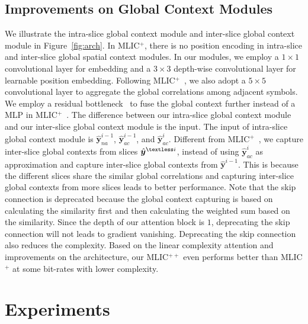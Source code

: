 \documentclass{article}
\theoremstyle{plain}
\theoremstyle{definition}
\theoremstyle{remark}
\begin{document}
  \subsection{Improvements on Global Context Modules}
  We illustrate the intra-slice global context module and 
  inter-slice global context module in Figure~\ref{fig:arch}.
  In MLIC$^+$, there is no position encoding in intra-slice and inter-slice global spatial
  context modules.
  In our modules, we employ a $1\times 1$ convolutional layer for embedding and a $3\times 3$
  depth-wise convolutional layer for learnable position embedding.
  Following MLIC$^+$~\cite{jiang2022mlic}, we also adopt a $5\times 5$
  convolutional layer to aggregate the global correlations among adjacent symbols.
  We employ a residual bottleneck~\cite{jiang2023slic} to fuse the global context further instead of a MLP in MLIC$^{+}$~\cite{jiang2022mlic}.
  The difference between our intra-slice global context module and
  our inter-slice global context module is the input.
  The input of intra-slice global context module is $\hat{\boldsymbol{y}}^{i-1}_{na}$,
  $\hat{\boldsymbol{y}}^{i-1}_{ac}$, and $\hat{\boldsymbol{y}}^i_{ac}$. 
  Different from MLIC$^{+}$~\cite{jiang2022mlic}, we capture inter-slice global contexts from slices
  $\hat{\boldsymbol{y}}^{\textless i}$, instead of using $\hat{\boldsymbol{y}}^{i}_{ac}$ as
  approximation and capture inter-slice global contexts from $\hat{\boldsymbol{y}}^{i-1}$.
  This is because the different slices share the similar global correlations
  and capturing inter-slice global contexts from more slices leads to better performance.
  Note that the skip connection is deprecated because the global context capturing
  is based on calculating the similarity first and then calculating the weighted sum based on the similarity.
  Since the depth of our attention block is $1$, deprecating the skip connection
  will not leads to gradient vanishing. Deprecating the skip connection also reduces the complexity.
  Based on the linear complexity attention and improvements on the architecture,
  our MLIC$^{++}$ even performs better than MLIC$^+$ at some bit-rates with lower complexity.
  \section{Experiments}
  \label{sec:exp}
\end{document}

